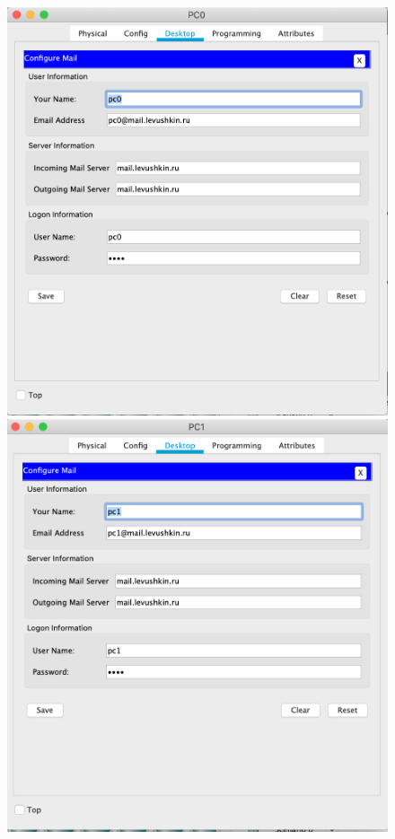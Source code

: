 \documentclass[a4paper,12pt]{article}
\begin{document}
	\begin{figure}[h!]
		\begin{minipage}[b]{0.32\textwidth}
			\includegraphics[width=\textwidth]{10.1.png}
		\end{minipage}
		\begin{minipage}[b]{0.32\textwidth}
			\includegraphics[width=\textwidth]{10.2.png}

\end{minipage}
\end{figure}
\end{document}
